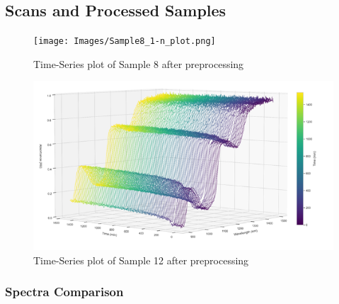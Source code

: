 \documentclass[12pt]{report}
\begin{document}
\subsection{Scans and Processed Samples}

\begin{figure}[!h]
    \centering
    \texttt{[image: Images/Sample8\_1-n\_plot.png]}
    \caption{Time-Series plot of Sample 8 after preprocessing}
    \label{fig:non-contaminated-8}
\end{figure}

\begin{figure}[!h]
    \centering
    \includegraphics[width=0.75\linewidth]{Images/sample12.png}
    \caption{Time-Series plot of Sample 12 after preprocessing}
    \label{fig:contaminated-12}
\end{figure}

\subsubsection{Spectra Comparison}
\end{document}
